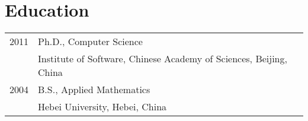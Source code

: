
\section*{Education}

\begin{longtable}{p{1in}p{5in}}
    2011 &	Ph.D., Computer Science\\
         &  Institute of Software, Chinese Academy of Sciences, Beijing, China\\
    2004 &	B.S., Applied Mathematics\\
         &  Hebei University, Hebei, China\\
\end{longtable}
